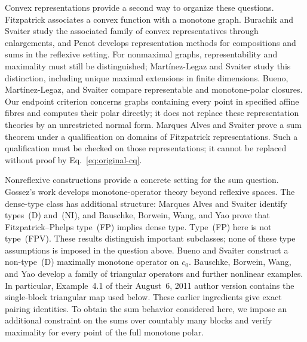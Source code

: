 Convex representations provide a second way to organize these questions.
Fitzpatrick \cite{fitzpatrick1988} associates a convex function with a
monotone graph. Burachik and Svaiter \cite{burachiksvaiter2002} study the
associated family of convex representatives through enlargements, and
Penot \cite{penot2004} develops representation methods for compositions
and sums in the reflexive setting. For nonmaximal graphs,
representability and maximality must still be distinguished;
Mart\'{i}nez-Legaz and Svaiter \cite{martinezsvaiter2005} study this
distinction, including unique maximal extensions in finite dimensions.
Bueno, Mart\'{i}nez-Legaz,
and Svaiter \cite{buenomartinezsvaiter2014} compare representable and
monotone-polar closures. Our endpoint criterion concerns graphs containing
every point in specified affine fibres and computes their polar directly; it does not
replace these representation theories by an unrestricted normal form.
Marques Alves and Svaiter \cite{marquessvaiter2012} prove a sum theorem
under a qualification on domains of Fitzpatrick representations.
Such a qualification must be checked on those representations; it cannot
be replaced without proof by Eq.~\eqref{eq:original-cq}.

Nonreflexive constructions provide a concrete setting for the sum question.
Gossez's work \cite{gossez1971} develops monotone-operator theory beyond
reflexive spaces. The dense-type class has additional structure:
Marques Alves and Svaiter \cite{marquessvaiter2010} identify types~(D)
and~(NI), and Bauschke, Borwein, Wang, and Yao \cite{bauschkefp2012}
prove that Fitzpatrick--Phelps type~(FP) implies dense type.
Type~(FP) here is not type~(FPV). These results distinguish important
subclasses; none of these type assumptions is imposed in the question above.
Bueno and Svaiter \cite{buenosvaiter2011} construct a non-type~(D)
maximally monotone operator on $c_0$. Bauschke, Borwein, Wang, and Yao
\cite{bauschkeetal2011} develop a family of triangular operators and
further nonlinear examples. In particular, Example~4.1 of their
August~6, 2011 author version contains
the single-block triangular map used below. These earlier ingredients
give exact pairing identities. To obtain the sum behavior considered
here, we impose an additional constraint on the sums over countably many
blocks and verify maximality for every point of the full monotone polar.

